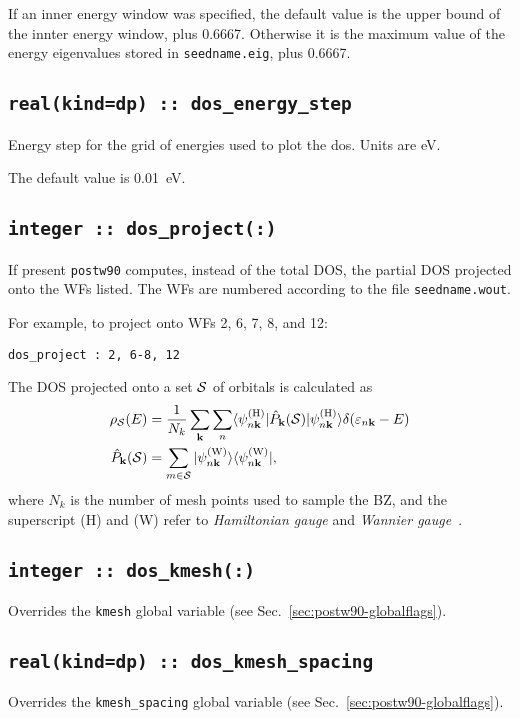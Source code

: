 If an inner energy window was specified, 
the default value is the upper bound of the innter energy window, plus 0.6667.
Otherwise it is  the maximum value of the energy eigenvalues
stored in {\tt seedname.eig}, plus 0.6667.

\subsection[dos\_energy\_step]{\tt real(kind=dp) :: dos\_energy\_step}
Energy step for the grid of energies used to plot the dos. Units are eV.

The default value is 0.01~eV.

\subsection[dos\_project]{\tt integer :: dos\_project(:)}

If present {\tt postw90} computes, instead of the total DOS, the
partial DOS projected onto the WFs listed. The WFs are numbered
according to the file {\tt seedname.wout}.

For example, to project onto WFs 2, 6, 7, 8, and 12:

{\tt dos\_project : 2, 6-8, 12}

The DOS projected onto a set ${\cal S}$ of orbitals is calculated as
%
\begin{align}
\rho_{\cal S}(E)&=\frac{1}{N_k}\sum_{\bf k}\sum_n
\langle \psi_{n\bf k}^{({\rm H})}\vert \hat{P}_{\bf k}({\cal S})\vert 
\psi_{n\bf k}^{({\rm H})}\rangle\delta(\varepsilon_{n\bf k}-E)\\
\hat{P}_{\bf k}({\cal S})&=\sum_{m\in{\cal S}}
\vert \psi_{n\bf k}^{({\rm W})}\rangle\langle \psi_{n\bf k}^{({\rm W})}\vert,
\end{align}
%
where $N_k$ is the number of mesh points used to sample the BZ, and
the superscript (H) and (W) refer to {\it Hamiltonian gauge} and {\it
  Wannier gauge}~\cite{wang-prb06}.

\subsection[dos\_kmesh]{\tt integer :: dos\_kmesh(:)}
Overrides the \verb#kmesh# global variable (see Sec.~\ref{sec:postw90-globalflags}).

\subsection[dos\_kmesh\_spacing]{\tt real(kind=dp) :: dos\_kmesh\_spacing}
Overrides the \verb#kmesh_spacing# global variable (see Sec.~\ref{sec:postw90-globalflags}).


